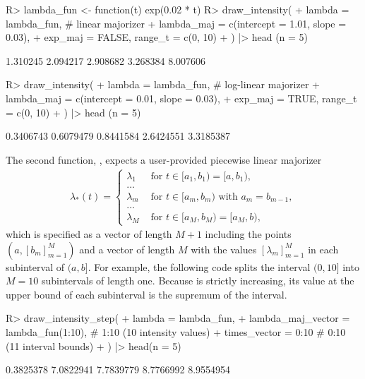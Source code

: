\documentclass[article,nojss]{jss}\usepackage[]{graphicx}\usepackage[]{xcolor}
\newcommand{\fct}[1]{\code{#1()}}
\begin{document}
\begin{Schunk}
\begin{Sinput}
R> lambda_fun <- function(t) exp(0.02 * t)
R> draw_intensity(
+    lambda = lambda_fun, # linear majorizer
+    lambda_maj = c(intercept = 1.01, slope = 0.03),
+    exp_maj = FALSE, range_t = c(0, 10)
+  ) |> head (n = 5)
\end{Sinput}
\begin{Soutput}
[1] 1.310245 2.094217 2.908682 3.268384 8.007606
\end{Soutput}
\begin{Sinput}
R> draw_intensity(
+    lambda = lambda_fun, # log-linear majorizer
+    lambda_maj = c(intercept = 0.01, slope = 0.03),
+    exp_maj = TRUE, range_t = c(0, 10)
+  ) |> head (n = 5)
\end{Sinput}
\begin{Soutput}
[1] 0.3406743 0.6079479 0.8441584 2.6424551 3.3185387
\end{Soutput}
\end{Schunk}


The second function, \fct{draw\_intensity\_step}, expects a user-provided piecewise linear majorizer
\begin{align*}
    \lambda_*(t) = \begin{cases}
    \lambda_1 &\textrm{ for } t \in [a_1, b_1) = [a, b_1), \\
    \dots &\\
    \lambda_m &\textrm{ for } t \in [a_m, b_m) \textrm{ with } a_{m} = b_{m-1}, \\
    \dots &\\
    \lambda_M &\textrm{ for } t \in [a_M, b_M) = [a_M, b),
    \end{cases}
\end{align*}
which is specified as a vector of length $M+1$ including the points $(a, [b_m]_{m=1}^M)$ and a vector of length $M$ with the values $[\lambda_m]_{m=1}^M$ in each subinterval of $(a, b]$. For example, the following code splits the interval $(0, 10]$ into $M=10$ subintervals of length one. Because \fct{lambda\_fun} is strictly increasing, its value at the upper bound of each subinterval is the supremum of the interval. 


\begin{Schunk}
\begin{Sinput}
R> draw_intensity_step(
+    lambda = lambda_fun,
+    lambda_maj_vector = lambda_fun(1:10), # 1:10 (10 intensity values)
+    times_vector = 0:10 # 0:10 (11 interval bounds)
+  ) |> head(n = 5)
\end{Sinput}
\begin{Soutput}
[1] 0.3825378 7.0822941 7.7839779 8.7766992 8.9554954
\end{Soutput}
\end{Schunk}
\end{document}
